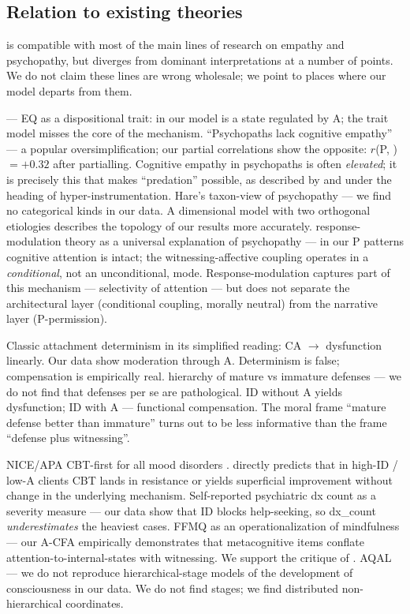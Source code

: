 \subsection{Relation to existing theories}
\label{subsec:relation_to_theories}

\DEIC{} is compatible with most of the main lines of research on empathy and psychopathy, but diverges from dominant interpretations at a number of points. We do not claim these lines are wrong wholesale; we point to places where our model departs from them.

\citet{baroncohen2011} --- EQ as a dispositional trait: in our model \EAF{} is a state regulated by A; the trait model misses the core of the mechanism. ``Psychopaths lack cognitive empathy'' --- a popular oversimplification; our partial correlations show the opposite: $r$(P, \Ecog{}) $= +0.32$ after partialling. Cognitive empathy in psychopaths is often \emph{elevated}; it is precisely this that makes ``predation'' possible, as described by \citet{blair2013} and \citet{baroncohen2011} under the heading of hyper-instrumentation. Hare's taxon-view of psychopathy --- we find no categorical kinds in our data. A dimensional model with two orthogonal etiologies describes the topology of our results more accurately. \citet{newman2003} response-modulation theory as a universal explanation of psychopathy --- in our P patterns cognitive attention is intact; the witnessing-affective coupling operates in a \emph{conditional}, not an unconditional, mode. Response-modulation captures part of this mechanism --- selectivity of attention --- but does not separate the architectural layer (conditional coupling, morally neutral) from the narrative layer (P-permission).

Classic attachment determinism \citep{bowlby1969} in its simplified reading: CA $\to$ dysfunction linearly. Our data show moderation through A. Determinism is false; compensation is empirically real. \citet{vaillant1977} hierarchy of mature vs immature defenses --- we do not find that defenses per se are pathological. ID without A yields dysfunction; ID with A --- functional compensation. The moral frame ``mature defense better than immature'' turns out to be less informative than the frame ``defense plus witnessing''.

NICE/APA CBT-first for all mood disorders \citep{nice2022, apa2019}. \DEIC{} directly predicts that in high-ID / low-A clients CBT lands in resistance or yields superficial improvement without change in the underlying mechanism. Self-reported psychiatric dx count as a severity measure --- our data show that ID blocks help-seeking, so dx\_count \emph{underestimates} the heaviest cases. FFMQ \citep{baer2006} as an operationalization of mindfulness --- our A-CFA empirically demonstrates that metacognitive items conflate attention-to-internal-states with witnessing. We support the critique of \citet{vandam2018}. \citet{wilber1995, wilber2000} AQAL --- we do not reproduce hierarchical-stage models of the development of consciousness in our data. We do not find stages; we find distributed non-hierarchical coordinates.

